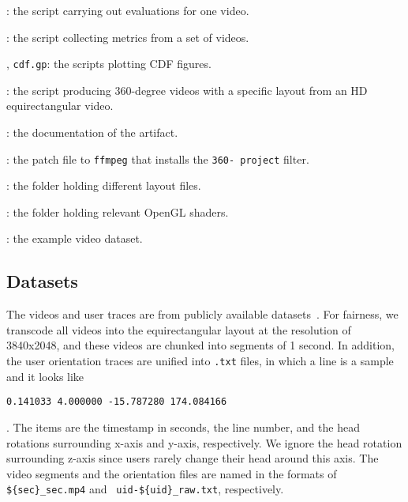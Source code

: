 : the script carrying out evaluations for one video.

: the script collecting metrics from a set of videos.

, {\tt cdf.gp}: the scripts plotting CDF figures.

: the script producing 360-degree videos with a specific layout from an HD equirectangular video.

: the documentation of the artifact.

: the patch file to {\tt ffmpeg} that installs the {\tt 360- project} filter.

: the folder holding different layout files.

: the folder holding relevant OpenGL shaders.

: the example video dataset.

\subsection{Datasets}
\label{sec:datasets}
The videos and user traces are from publicly available
datasets~\cite{Corbillon:2017:VHM:3083187.3083215,Wu:2017:DEU:3083187.3083210}. For fairness, we transcode all videos
into the equirectangular layout at the resolution of 3840x2048, and these videos are chunked into segments of 1
second. In addition, the user orientation traces are unified into {\tt .txt} files, in which a line is a sample and it looks like

{\tt 0.141033 4.000000 -15.787280 174.084166}

\noindent. The items are the timestamp in seconds, the line number, and the head rotations surrounding x-axis and
y-axis, respectively. We ignore the head rotation surrounding z-axis since users rarely change their head around this
axis. The video segments and the orientation files are named in the formats of {\tt \$\{sec\}\_sec.mp4} and {\tt
  uid-\$\{uid\}\_raw.txt}, respectively.


